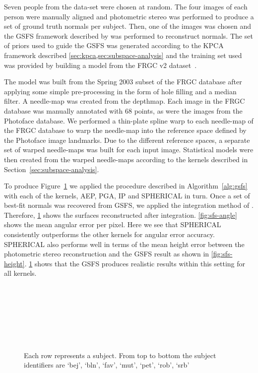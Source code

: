 Seven people from the data-set were chosen at random. The four images of each 
person were manually aligned and photometric stereo was performed to produce a
set of ground truth normals per subject. Then, one of the images was chosen 
and the GSFS framework described by \citet{RefWorks:86,RefWorks:90} 
was performed to reconstruct normals. The set of priors used to guide the GSFS 
was generated according to the KPCA framework described 
\cref{sec:kpca,sec:subspace-analysis} and the training set used was provided by 
building a model from the FRGC v2 dataset~\cite{RefWorks:251}.

The model was built from the Spring 2003 subset of the FRGC database after 
applying some simple pre-processing in the form of hole filling and a median 
filter. A needle-map was created from the depthmap. Each image in the FRGC 
database was manually annotated with 68 points, as were the images from the 
Photoface database. We performed a thin-plate spline warp to each needle-map 
of the FRGC database to warp the needle-map into the reference space defined 
by the Photoface image landmarks. Due to the different reference spaces, a 
separate set of warped needle-maps was built for each input image. Statistical 
models were then created from the warped needle-maps according to the kernels 
described in Section~\ref{sec:subspace-analysis}.

To produce Figure~\ref{fig:sfs-results} we applied the procedure described in 
Algorithm~\ref{alg:gsfs} with each of the kernels, AEP, PGA, IP and SPHERICAL 
in turn. Once a set of best-fit normals was recovered from GSFS, we applied 
the integration method of \citet{RefWorks:99}. 
Therefore, \cref{fig:sfs-results} shows the surfaces reconstructed 
after integration. \cref{fig:sfs-angle} shows the mean angular error 
per pixel. Here we see that SPHERICAL consistently outperforms the other 
kernels for angular error accuracy. SPHERICAL also performs well in terms of 
the mean height error between the photometric stereo reconstruction and the 
GSFS result as shown in \cref{fig:sfs-height}. \cref{fig:sfs-results} 
shows that the GSFS produces realistic results within this setting for all kernels.
\begin{figure}
    \centering
     \\
     \\
     \\
     \\
     \\
     \\
    \caption{Each row represents a subject. From top to bottom the subject 
             identifiers are `bej', `bln', `fav', `mut', `pet', `rob', `srb'}
\label{fig:sfs-results}
\end{figure}
